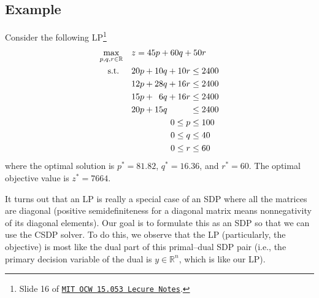 \documentclass[a4paper]{article}
\begin{document}
\subsection*{Example}
Consider the following LP\footnote{Slide 16 of \href{https://ocw.mit.edu/courses/sloan-school-of-management/15-053-optimization-methods-in-management-science-spring-2013/tutorials/MIT15_053S13_tut01.pdf}{\texttt{MIT OCW 15.053 Lecure Notes}}.}
\begin{equation}\label{eq:example-lp}
\begin{split}
\max_{p,q,r\in\mathbb{R}}  \quad & z = 45p + 60q + 50r \\
\textrm{s.t. } \quad &
  \begin{aligned}[t]
    20p + 10q + 10r &\le 2400 \\
    12p + 28q + 16r &\le 2400 \\
    15p + \hphantom{0}6q  + 16r &\le 2400 \\
    20p + 15q \hphantom{{}+{}00r} &\le 2400 \\
    0 \le p &\le 100 \\
    0 \le q &\le 40 \\
    0 \le r &\le 60
  \end{aligned}
\end{split}
\end{equation}
where the optimal solution is $p^*=81.82$, $q^*=16.36$, and $r^*=60$.
The optimal objective value is $z^*=7664$.

It turns out that an LP is really a special case of an SDP where all the matrices are diagonal (positive semidefiniteness for a diagonal matrix means nonnegativity of its diagonal elements).
Our goal is to formulate this as an SDP so that we can use the CSDP solver.
To do this, we observe that the LP (particularly, the objective) is most like the dual part of this primal--dual SDP pair (i.e., the primary decision variable of the dual is $y\in\mathbb{R}^n$, which is like our LP).
\end{document}
